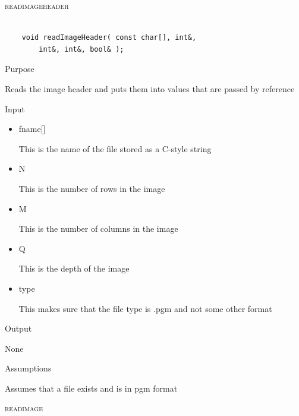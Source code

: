 \documentclass[pdftex, 11pt]{article}
\begin{document}
\begin{description}
	\item{\textsc{readimageheader}}

		\begin{lstlisting}

	void readImageHeader( const char[], int&, 
		int&, int&, bool& );
		\end{lstlisting}

		\begin{description}
			\item{Purpose}

				Reads the image header and puts them into values that
				are passed by reference

			\item{Input}

				\begin{itemize}

					\item{fname[]}

						This is the name of the file stored
						as a C-style string

					\item{N}

						This is the number of rows in the image

					\item{M}

						This is the number of columns in
						the image

					\item{Q}

						This is the depth of the image

					\item{type}

						This makes sure that the file type is
						.pgm and not some other format
						
				\end{itemize}
						
						
			\item{Output}

				None

			\item{Assumptions}

				Assumes that a file exists and is in pgm format

		\end{description}


	\item{\textsc{readimage}}

		\begin{lstlisting}


\end{lstlisting}
\end{description}
\end{document}
